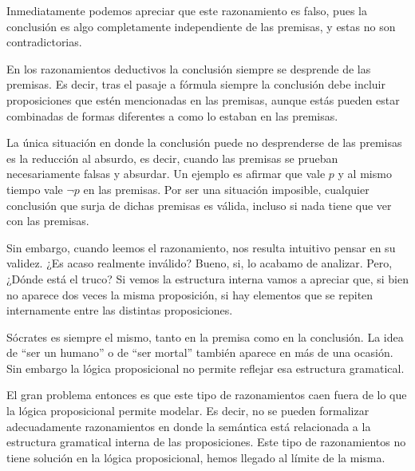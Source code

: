 Inmediatamente podemos apreciar que este razonamiento es falso, pues la
conclusión es algo completamente independiente de las premisas, y estas no son
contradictorias.

\begin{knowwhat}
    En los razonamientos deductivos la conclusión siempre se desprende de las
    premisas. Es decir, tras el pasaje a fórmula siempre la conclusión debe
    incluir proposiciones que estén mencionadas en las premisas, aunque estás
    pueden estar combinadas de formas diferentes a como lo estaban en las
    premisas.

    La única situación en donde la conclusión puede no desprenderse de las
    premisas es la reducción al absurdo, es decir, cuando las premisas se
    prueban necesariamente falsas y absurdar. Un ejemplo es afirmar que vale $p$
    y al mismo tiempo vale $\lnot p$ en las premisas. Por ser una situación
    imposible, cualquier conclusión que surja de dichas premisas es válida,
    incluso si nada tiene que ver con las premisas.
\end{knowwhat}

Sin embargo, cuando leemos el razonamiento, nos resulta intuitivo pensar en su
validez. ¿Es acaso realmente inválido? Bueno, si, lo acabamo de analizar. Pero,
¿Dónde está el truco? Si vemos la estructura interna vamos a apreciar que, si
bien no aparece dos veces la misma proposición, si hay elementos que se repiten
internamente entre las distintas proposiciones.

\begin{example}
    \begin{lreasoning}[width=0.6\textwidth,margin=\value{dindentwidth} pt]
    \end{lreasoning}
\end{example}

Sócrates es siempre el mismo, tanto en la premisa como en la conclusión. La idea
de ``ser un humano'' o de ``ser mortal'' también aparece en más de una ocasión.
Sin embargo la lógica proposicional no permite reflejar esa estructura
gramatical.

El gran problema entonces es que este tipo de razonamientos caen fuera de lo que
la lógica proposicional permite modelar. Es decir, no se pueden formalizar
adecuadamente razonamientos en donde la semántica está relacionada a la
estructura gramatical interna de las proposiciones. Este tipo de razonamientos
no tiene solución en la lógica proposicional, hemos llegado al límite de la
misma.

